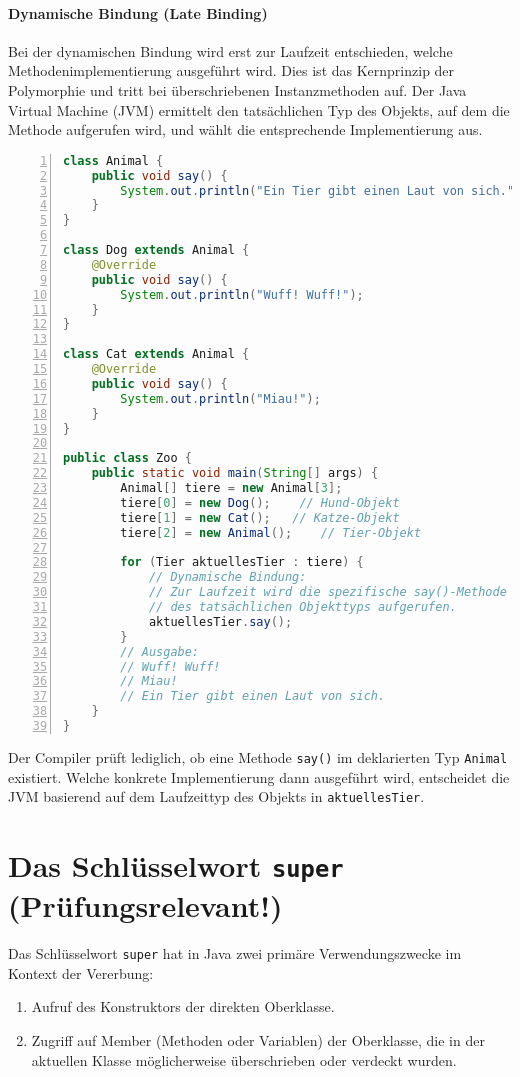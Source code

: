 \paragraph{Dynamische Bindung (Late Binding)}
Bei der dynamischen Bindung wird erst zur Laufzeit entschieden, welche Methodenimplementierung ausgeführt wird. Dies ist 
das Kernprinzip der Polymorphie und tritt bei überschriebenen Instanzmethoden auf. Der Java Virtual Machine (JVM) ermittelt 
den tatsächlichen Typ des Objekts, auf dem die Methode aufgerufen wird, und wählt die entsprechende Implementierung aus.

\begin{lstlisting}[language=Java, caption={Beispiel für dynamische Bindung}, label=lst:dynamische_bindung, basicstyle=\ttfamily\footnotesize, 
    breaklines=true, frame=tb, numbers=left]
class Animal {
    public void say() {
        System.out.println("Ein Tier gibt einen Laut von sich.");
    }
}

class Dog extends Animal {
    @Override
    public void say() {
        System.out.println("Wuff! Wuff!");
    }
}

class Cat extends Animal {
    @Override
    public void say() {
        System.out.println("Miau!");
    }
}

public class Zoo {
    public static void main(String[] args) {
        Animal[] tiere = new Animal[3];
        tiere[0] = new Dog();    // Hund-Objekt
        tiere[1] = new Cat();   // Katze-Objekt
        tiere[2] = new Animal();    // Tier-Objekt

        for (Tier aktuellesTier : tiere) {
            // Dynamische Bindung:
            // Zur Laufzeit wird die spezifische say()-Methode
            // des tatsächlichen Objekttyps aufgerufen.
            aktuellesTier.say();
        }
        // Ausgabe:
        // Wuff! Wuff!
        // Miau!
        // Ein Tier gibt einen Laut von sich.
    }
}
\end{lstlisting}
Der Compiler prüft lediglich, ob eine Methode \texttt{say()} im deklarierten Typ \texttt{Animal} existiert. Welche konkrete 
Implementierung dann ausgeführt wird, entscheidet die JVM basierend auf dem Laufzeittyp des Objekts in \texttt{aktuellesTier}.

\section{Das Schlüsselwort \texttt{super} (Prüfungsrelevant!)}
\label{sec:super}

Das Schlüsselwort \texttt{super} hat in Java zwei primäre Verwendungszwecke im Kontext der Vererbung:
\begin{enumerate}
    \item Aufruf des Konstruktors der direkten Oberklasse.
    \item Zugriff auf Member (Methoden oder Variablen) der Oberklasse, die in der aktuellen Klasse möglicherweise überschrieben oder verdeckt wurden.
\end{enumerate}

